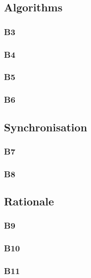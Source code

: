 \documentclass[a4wide, 11pt]{article}
\begin{document}
\subsection{Algorithms}
\subsubsection{B3}

\subsubsection{B4}

\subsubsection{B5}

\subsubsection{B6}

\subsection{Synchronisation}
\subsubsection{B7}

\subsubsection{B8}

\subsection{Rationale}
\subsubsection{B9}

\subsubsection{B10}

\subsubsection{B11}
\end{document}
